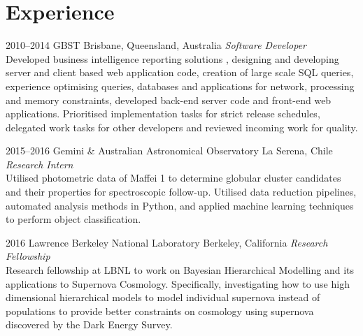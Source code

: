 \documentclass[]{friggeri-cv} %
\begin{document}
\section{Experience}

\begin{entrylist}
\entry
{2010--2014}
{GBST}
{Brisbane, Queensland, Australia}
{\emph{Software Developer} \\
Developed business intelligence reporting solutions , designing and developing server and client based web application code, creation of large scale SQL queries, experience optimising queries, databases and applications for network, processing and memory constraints, developed back-end server code and front-end web applications. Prioritised implementation tasks for strict release schedules, delegated work tasks for other developers and reviewed incoming work for quality.}

\entry
{2015--2016}
{Gemini \& Australian Astronomical Observatory}
{La Serena, Chile}
{\emph{Research Intern} \\
Utilised photometric data of Maffei 1 to determine globular cluster candidates and their properties for spectroscopic follow-up. Utilised data reduction pipelines, automated analysis methods in Python, and applied machine learning techniques to perform object classification.}


\entry
{2016}
{Lawrence Berkeley National Laboratory}
{Berkeley, California}
{\emph{Research Fellowship} \\
	Research fellowship at LBNL to work on Bayesian Hierarchical Modelling and its applications to Supernova Cosmology. Specifically, investigating how to use high dimensional hierarchical models to model individual supernova instead of populations to provide better constraints on cosmology using supernova discovered by the Dark Energy Survey.}


\end{entrylist}
\end{document}
